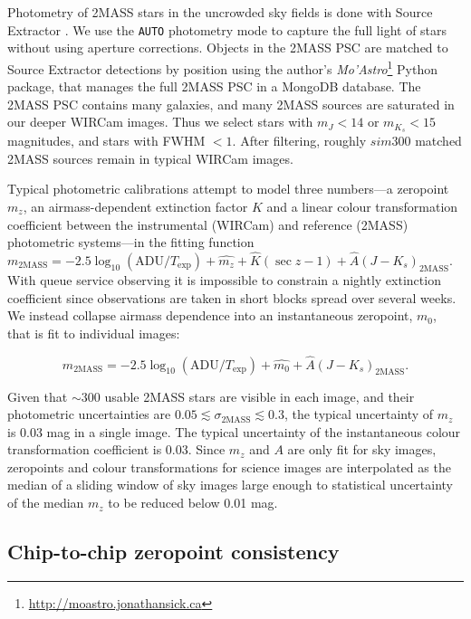 \documentclass[iop]{emulateapj}
\newcommand{\sw}[1]{\textit{#1}} %
\begin{document}
Photometry of 2MASS stars in the uncrowded sky fields is done with Source Extractor \citep{Bertin:1996}.
We use the \texttt{AUTO} photometry mode to capture the full light of stars without using aperture corrections.
Objects in the 2MASS PSC are matched to Source Extractor detections by position using the author's \sw{Mo'Astro}\footnote{\url{http://moastro.jonathansick.ca}} Python package, that manages the full 2MASS PSC in a MongoDB database.
The 2MASS PSC contains many galaxies, and many 2MASS sources are saturated in our deeper WIRCam images.
Thus we select stars with $m_J < 14$ or $m_{K_s} < 15$ magnitudes, and stars with FWHM $<1$\arcsec.
After filtering, roughly $sim 300$ matched 2MASS sources remain in typical WIRCam images.

Typical photometric calibrations attempt to model three numbers---a zeropoint $m_z$, an airmass-dependent extinction factor $K$ and a linear colour transformation coefficient between the instrumental (WIRCam) and reference (2MASS) photometric systems---in the fitting function $m_\mathrm{2MASS} = -2.5 \log_{10}(\mathrm{ADU}/T_\mathrm{exp}) + \hat{m_z} + \hat{K} (\sec z -1) + \hat{A} (J-K_s)_\mathrm{2MASS}$.
With queue service observing it is impossible to constrain a nightly extinction coefficient since observations are taken in short blocks spread over several weeks.
We instead collapse airmass dependence into an instantaneous zeropoint, $m_0$, that is fit to individual images:

\begin{equation}
  \label{eq:photcal}
  m_\mathrm{2MASS} = -2.5 \log_{10}(\mathrm{ADU}/T_\mathrm{exp}) + \hat{m_0} + \hat{A} (J-K_s)_\mathrm{2MASS}.
\end{equation}

Given that $\sim 300$ usable 2MASS stars are visible in each image, and their photometric uncertainties are $0.05 \lesssim \sigma_{\mathrm{2MASS}} \lesssim 0.3$, the typical uncertainty of $m_z$ is 0.03 mag in a single image. The typical uncertainty of the instantaneous colour transformation coefficient is 0.03. Since $m_z$ and $A$ are only fit for sky images, zeropoints and colour transformations for science images are interpolated as the median of a sliding window of sky images large enough to statistical uncertainty of the median $m_z$ to be reduced below 0.01 mag.

\subsection{Chip-to-chip zeropoint consistency}
\label{sec:chip_zp}
\end{document}
